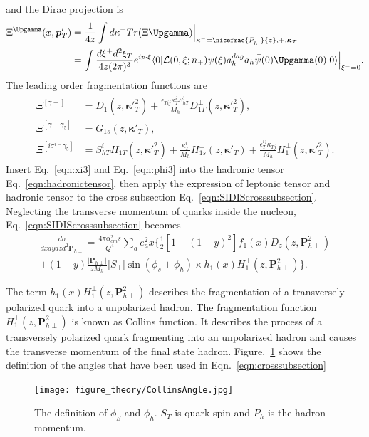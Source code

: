 and the Dirac projection is
\begin{equation}
\begin{aligned}
  \Xi^{\Upgamma}(x,\boldsymbol{p}'_T) &=\frac{1}{4z}\int d\kappa^+Tr(\Xi\Upgamma)\Big|_{\kappa^-=\nicefrac{P^-_h}{z},+,\boldsymbol{\kappa}_T} \\
    &=\int \frac{d\xi^+d^2\xi_T}{4z(2\pi)^3}e^{ip\cdot\xi}\langle 0|\mathcal{L}(0,\xi;n_+)\psi(\xi)a^{dag}_ha_h\bar{\psi}(0)\Upgamma(0)|0\rangle\Big|_{\xi^-=0}.
\label{eqn:xidirac}
\end{aligned}
\end{equation}
The leading order fragmentation functions are
\begin{equation}
\begin{aligned}
       \Xi^{[\gamma-]}&=D_1(z,\boldsymbol{\kappa}'^2_{T})+\frac{\epsilon_{Tij}\kappa^i_TS^j_{hT}}{M_h}D^{\perp}_{1T}(z,\boldsymbol{\kappa}'^2_T), \\
       \Xi^{[\gamma-\gamma_5]}&=G_{1s}(z,\boldsymbol{\kappa}'_{T}),\\
       \Xi^{[i\sigma^{i-}\gamma_5]}&=S^i_{hT}H_{1T}(z,\boldsymbol{\kappa}'^2_T)+\frac{\kappa^i_T}{M_h}H^{\perp}_{1s}(z,\boldsymbol{\kappa}'_T)+\frac{\epsilon^{ij}_T\kappa_{Tj}}{M_h}H^{\perp}_{1}(z,\boldsymbol{\kappa}'^2_T).
\end{aligned}
\label{eqn:xi3}
\end{equation}
Insert Eq.~\eqref{eqn:xi3} and Eq.~\eqref{eqn:phi3} into the hadronic tensor Eq.~\eqref{eqn:hadronictensor}, then apply the expression of leptonic tensor and hadronic tensor to the cross subsection Eq.~\eqref{eqn:SIDIScrosssubsection}. 
Neglecting the transverse momentum of quarks inside the nucleon, Eq.~\eqref{eqn:SIDIScrosssubsection} becomes
\begin{equation}
\begin{aligned}
  \frac{d\sigma}{dxdydzd^2\boldsymbol{P}_{h\perp}}=\frac{4\pi\alpha^2_{em}s}{Q^4}\sum_ae^2_ax\{\frac{1}{2}[1+(1-y)^2]f_1(x)D_z(z,\boldsymbol{P}^2_{h\perp}) \\
+(1-y)\frac{|\boldsymbol{P}_{h\perp}|}{zM_h}|S_{\perp}|\sin(\phi_s+\phi_h)\times h_1(x)H^{\perp}_1(z,\boldsymbol{P}^2_{h\perp})\}.
\end{aligned}
\label{eqn:crosssubsection}
\end{equation}

The term $h_1(x)H^{\perp}_1(z,\boldsymbol{P}^2_{h\perp})$ describes the fragmentation of a transversely polarized quark into a unpolarized hadron. The fragmentation function $H^{\perp}_1(z,\boldsymbol{P}^2_{h\perp})$ is known as Collins function. It describes the process of a transversely polarized quark fragmenting into an unpolarized hadron and causes the transverse momentum of the final state hadron. Figure.~\ref{fig:collinsangle} shows the definition of the angles that have been used in Eqn.~\ref{eqn:crosssubsection}
\begin{figure}[h]
   \centering
   \texttt{[image: figure\_theory/CollinsAngle.jpg]}
    \caption[]{The definition of $\phi_S$ and $\phi_h$. $S_T$ is quark spin and $P_h$ is the hadron momentum. }
    \label{fig:collinsangle}
\end{figure}

